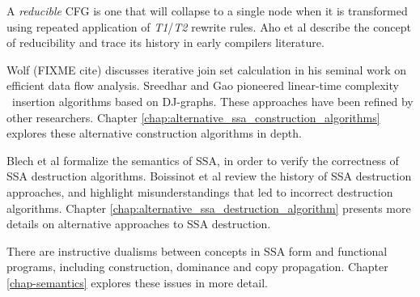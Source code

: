 A \textit{reducible} CFG is one that will collapse to a single node when 
it is transformed using repeated application of \emph{T1}/\emph{T2}
rewrite rules.
Aho et al \cite{aho86compilers} describe the concept of reducibility
and trace its history in early compilers literature.

Wolf (FIXME cite) discusses iterative join set calculation in his
seminal work on efficient data flow analysis.
Sreedhar and Gao \cite{sreedhar95linear} pioneered
linear-time complexity 
\phiop\ insertion
algorithms based on DJ-graphs.
These approaches have been refined by other researchers.
Chapter \ref{chap:alternative_ssa_construction_algorithms}
explores these alternative construction algorithms in depth.


Blech et al \cite{blech05optimizing}
formalize the semantics of SSA, in order to verify
the correctness of SSA destruction algorithms.
Boissinot et al \cite{boissinot09revisiting} review the history of SSA destruction approaches,
and highlight misunderstandings that led to incorrect destruction
algorithms.
Chapter \ref{chap:alternative_ssa_destruction_algorithm} presents
more details on alternative approaches to SSA destruction.

There are instructive dualisms between concepts in SSA form
and
functional programs, including construction, dominance and
copy propagation. Chapter \ref{chap-semantics} explores these issues
in more detail.



